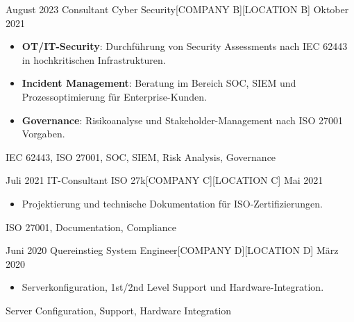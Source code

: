 \begin{experiences}
\emptySeparator 

\experience
    {August 2023}   {Consultant Cyber Security}{[COMPANY B]}{[LOCATION B]}
    {Oktober 2021} {
                      \begin{itemize}
                        \item \textbf{OT/IT-Security}: Durchführung von Security Assessments nach IEC 62443 in hochkritischen Infrastrukturen.
                        \item \textbf{Incident Management}: Beratung im Bereich SOC, SIEM und Prozessoptimierung für Enterprise-Kunden.
                        \item \textbf{Governance}: Risikoanalyse und Stakeholder-Management nach ISO 27001 Vorgaben.
                      \end{itemize}
                    }
                    {IEC 62443, ISO 27001, SOC, SIEM, Risk Analysis, Governance}

\emptySeparator 

\experience
    {Juli 2021}   {IT-Consultant ISO 27k}{[COMPANY C]}{[LOCATION C]}
    {Mai 2021} {
                      \begin{itemize}
                        \item Projektierung und technische Dokumentation für ISO-Zertifizierungen.
                      \end{itemize}
                    }
                    {ISO 27001, Documentation, Compliance}

\emptySeparator

\experience
    {Juni 2020}   {Quereinstieg System Engineer}{[COMPANY D]}{[LOCATION D]}
    {März 2020} {
                      \begin{itemize}
                        \item Serverkonfiguration, 1st/2nd Level Support und Hardware-Integration.
                      \end{itemize}
                    }
                    {Server Configuration, Support, Hardware Integration}

\end{experiences}
